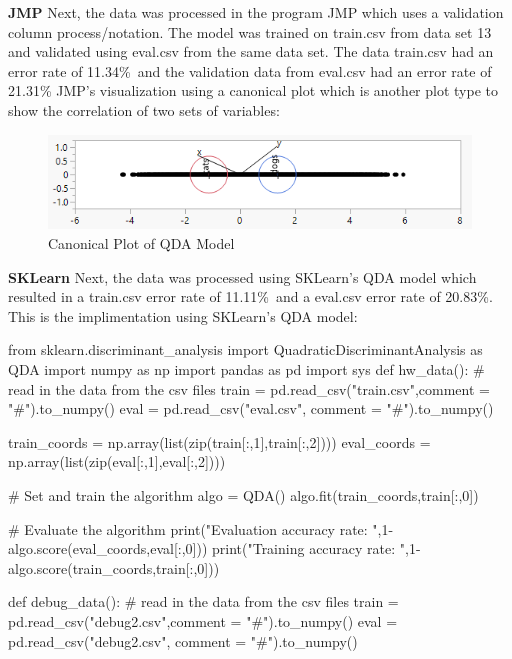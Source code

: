 \documentclass{article}
\begin{document}
\begin{flushleft}
\break
\textbf{JMP}\break
\break
Next, the data was processed in the program JMP which uses a validation column process/notation. The model was trained on train.csv from data set 13 and validated using eval.csv from the same data set. The data train.csv had an error rate of 11.34\%\ and the validation data from eval.csv had an error rate of 21.31\%\break
\break
JMP's visualization using a canonical plot which is another plot type to show the correlation of two sets of variables:\break
\begin{figure}[!htb]
        \centering
        \begin{minipage}{0.49\textwidth}
                \centering
                \includegraphics[width=1\linewidth]{../JMPCanonicalPlot.png}
                \caption{Canonical Plot of QDA Model}
        \end{minipage}
\end{figure}
\pagebreak
\textbf{SKLearn}\break
\break
Next, the data was processed using SKLearn's QDA model which resulted in a train.csv error rate of 11.11\%\ and a eval.csv error rate of 20.83\%.\break
\break
This is the implimentation using SKLearn's QDA model:\break
\begin{python}
        from sklearn.discriminant_analysis import QuadraticDiscriminantAnalysis as QDA
        import numpy as np
        import pandas as pd
        import sys
        def hw_data():
        # read in the data from the csv files
        train = pd.read_csv("train.csv",comment = "#").to_numpy()
        eval = pd.read_csv("eval.csv", comment = "#").to_numpy()
        
        train_coords = np.array(list(zip(train[:,1],train[:,2])))
        eval_coords = np.array(list(zip(eval[:,1],eval[:,2])))
        
        # Set and train the algorithm
        algo = QDA()
        algo.fit(train_coords,train[:,0])
        
        # Evaluate the algorithm
        print("Evaluation accuracy rate: ",1-algo.score(eval_coords,eval[:,0]))
        print("Training accuracy rate: ",1-algo.score(train_coords,train[:,0]))
        
        def debug_data():
        # read in the data from the csv files
        train = pd.read_csv("debug2.csv",comment = "#").to_numpy()
        eval = pd.read_csv("debug2.csv", comment = "#").to_numpy()
        

\end{python}
\end{flushleft}
\end{document}
